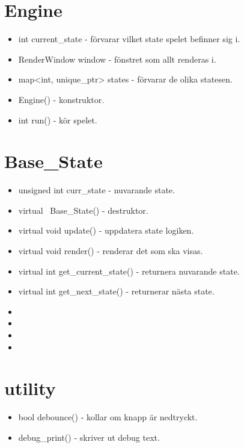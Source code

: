 \documentclass{TDP005mall}
\begin{document}
\section{Engine}

\begin{itemize}
\item int current\_state - förvarar vilket state spelet befinner sig i.
\item RenderWindow window - fönstret som allt renderas i.
\item map<int, unique\_ptr> states - förvarar de olika statesen.

\item Engine() - konstruktor.
\item int run() - kör spelet.
\end{itemize}


\section{Base\_State}

\begin{itemize}
  
\item unsigned int curr\_state - nuvarande state.
\item virtual ~Base\_State() - destruktor.
\item virtual void update() - uppdatera state logiken.
\item virtual void render() - renderar det som ska visas.
\item virtual int get\_current\_state() - returnera nuvarande state.
\item virtual int get\_next\_state() - returnerar nästa state.
\item 
\item
\item
\item
  
\end{itemize}


\section{utility}

\begin{itemize}
  
\item bool debounce() - kollar om knapp är nedtryckt.
\item debug\_print() - skriver ut debug text.
  
  
\end{itemize}
\end{document}
